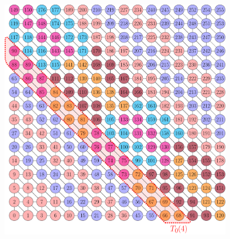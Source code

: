        \begin{figure}[thbp]
       	\begin{minipage}[c]{0.6\textwidth}
       		\includegraphics[height=0.3\textheight,width=0.89\textwidth]{pics/recursion/2d-7pt_example/2d-7pt/stencil_2d_7pt}
       	\end{minipage}\hfill
       	\begin{minipage}[c]{0.4\textwidth}

\end{minipage}
\end{figure}
